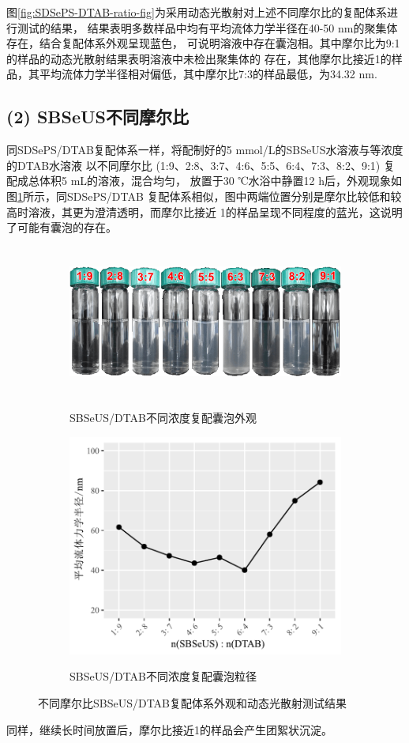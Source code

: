 \documentclass[bachelor,fandolfonts,replaceperiod]{jnuthesis}
\begin{document}
    图\ref{fig:SDSePS-DTAB-ratio-fig}为采用动态光散射对上述不同摩尔比的复配体系进行测试的结果，
    结果表明多数样品中均有平均流体力学半径在40-50 nm的聚集体存在，结合复配体系外观呈现蓝色，
    可说明溶液中存在囊泡相。其中摩尔比为9:1的样品的动态光散射结果表明溶液中未检出聚集体的
    存在，其他摩尔比接近1的样品，其平均流体力学半径相对偏低，其中摩尔比7:3的样品最低，为34.32 nm.

    \subsection*{(2) SBSeUS不同摩尔比}
    同SDSePS/DTAB复配体系一样，将配制好的5 mmol/L的SBSeUS水溶液与等浓度的DTAB水溶液
    以不同摩尔比 (1:9、2:8、3:7、4:6、5:5、6:4、7:3、8:2、9:1) 复配成总体积5 mL的溶液，混合均匀，
    放置于30 ℃水浴中静置12 h后，外观现象如图\ref{fig:SBSeUS-DTAB-ratio}所示，同SDSePS/DTAB
    复配体系相似，图中两端位置分别是摩尔比较低和较高时溶液，其更为澄清透明，而摩尔比接近
    1的样品呈现不同程度的蓝光，这说明了可能有囊泡的存在。
    \begin{figure}[htbp]
        \centering
        \begin{subfigure}[]{\textwidth}
            \centering
            \includegraphics[height=5cm]{figure/SBSeUS-DTAB-ratio.png}\\
            \caption{SBSeUS/DTAB不同浓度复配囊泡外观}\label{fig:SBSeUS-DTAB-ratio}
        \end{subfigure}%

        \begin{subfigure}[]{\textwidth}
            \centering
            \includegraphics[width=.6\textwidth]{figure/SBSeUS-DTAB-ratio-fig.pdf}\\
            \caption{SBSeUS/DTAB不同浓度复配囊泡粒径}\label{fig:SBSeUS-DTAB-ratio-fig}
        \end{subfigure}%
        \caption{不同摩尔比SBSeUS/DTAB复配体系外观和动态光散射测试结果}
        \label{fig:不同摩尔比SBSeUS/DTAB}
    \end{figure}
    同样，继续长时间放置后，摩尔比接近1的样品会产生团絮状沉淀。
    
\end{document}

